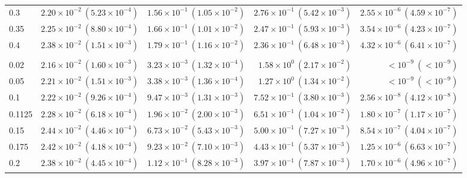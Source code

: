 \begin{table}[htbp]
\begin{tabular}{@{} l rrrr @{}}
0.3 & $2.20\!\times\!10^{-2}\ (5.23\!\times\!10^{-4})$ & $1.56\!\times\!10^{-1}\ (1.05\!\times\!10^{-2})$ & $2.76\!\times\!10^{-1}\ (5.42\!\times\!10^{-3})$ & $2.55\!\times\!10^{-6}\ (4.59\!\times\!10^{-7})$ \\
0.35 & $2.25\!\times\!10^{-2}\ (8.80\!\times\!10^{-4})$ & $1.66\!\times\!10^{-1}\ (1.01\!\times\!10^{-2})$ & $2.47\!\times\!10^{-1}\ (5.93\!\times\!10^{-3})$ & $3.54\!\times\!10^{-6}\ (4.23\!\times\!10^{-7})$ \\
0.4 & $2.38\!\times\!10^{-2}\ (1.51\!\times\!10^{-3})$ & $1.79\!\times\!10^{-1}\ (1.16\!\times\!10^{-2})$ & $2.36\!\times\!10^{-1}\ (6.48\!\times\!10^{-3})$ & $4.32\!\times\!10^{-6}\ (6.41\!\times\!10^{-7})$ \\
\addlinespace
\multicolumn{5}{@{}l}{\textit{Wide ($p \sim \mathcal{U}(0.05, 0.3)$)}} \\
0.02 & $2.16\!\times\!10^{-2}\ (1.60\!\times\!10^{-3})$ & $3.23\!\times\!10^{-3}\ (1.32\!\times\!10^{-4})$ & $1.58\!\times\!10^{0}\ (2.17\!\times\!10^{-2})$ & $<\!10^{-9}\ (<\!10^{-9})$ \\
0.05 & $2.21\!\times\!10^{-2}\ (1.51\!\times\!10^{-3})$ & $3.38\!\times\!10^{-3}\ (1.36\!\times\!10^{-4})$ & $1.27\!\times\!10^{0}\ (1.34\!\times\!10^{-2})$ & $<\!10^{-9}\ (<\!10^{-9})$ \\
0.1 & $2.22\!\times\!10^{-2}\ (9.26\!\times\!10^{-4})$ & $9.47\!\times\!10^{-3}\ (1.31\!\times\!10^{-3})$ & $7.52\!\times\!10^{-1}\ (3.80\!\times\!10^{-3})$ & $2.56\!\times\!10^{-8}\ (4.12\!\times\!10^{-8})$ \\
0.1125 & $2.28\!\times\!10^{-2}\ (6.18\!\times\!10^{-4})$ & $1.96\!\times\!10^{-2}\ (2.00\!\times\!10^{-3})$ & $6.51\!\times\!10^{-1}\ (1.04\!\times\!10^{-2})$ & $1.80\!\times\!10^{-7}\ (1.17\!\times\!10^{-7})$ \\
0.15 & $2.44\!\times\!10^{-2}\ (4.46\!\times\!10^{-4})$ & $6.73\!\times\!10^{-2}\ (5.43\!\times\!10^{-3})$ & $5.00\!\times\!10^{-1}\ (7.27\!\times\!10^{-3})$ & $8.54\!\times\!10^{-7}\ (4.04\!\times\!10^{-7})$ \\
0.175 & $2.42\!\times\!10^{-2}\ (4.18\!\times\!10^{-4})$ & $9.23\!\times\!10^{-2}\ (7.10\!\times\!10^{-3})$ & $4.43\!\times\!10^{-1}\ (5.37\!\times\!10^{-3})$ & $1.25\!\times\!10^{-6}\ (6.63\!\times\!10^{-7})$ \\
0.2 & $2.38\!\times\!10^{-2}\ (4.45\!\times\!10^{-4})$ & $1.12\!\times\!10^{-1}\ (8.28\!\times\!10^{-3})$ & $3.97\!\times\!10^{-1}\ (7.87\!\times\!10^{-3})$ & $1.70\!\times\!10^{-6}\ (4.96\!\times\!10^{-7})$ \\

\end{tabular}
\end{table}
